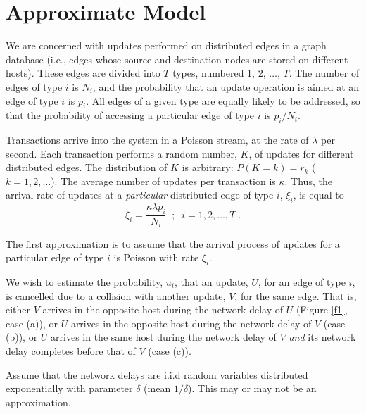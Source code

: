 \documentclass[runningheads]{llncs}
\begin{document}
\section{Approximate Model}

We are concerned with updates performed on distributed edges in a
graph database (i.e., edges whose source and destination nodes are
stored on different hosts). These edges are divided into $T$ types,
numbered 1, 2, $\ldots$, $T$. The number of edges of type $i$ is $N_i$,
and the probability that an update operation is aimed at an edge of
type $i$ is $p_i$. All edges of a given type are equally likely to be
addressed, so that the probability of accessing a particular edge of
type $i$ is $p_i/N_i$.

Transactions arrive into the system in a Poisson stream, at the rate
of $\lambda$ per second. Each transaction performs a random number, $K$,
of updates for different distributed edges. The distribution of $K$ is
arbitrary: $P(K=k)=r_k$ ($k=1,2,\ldots$). The average number of updates
per transaction is $\kappa$. Thus, the arrival rate of updates at a
{\em particular} distributed edge of type $i$, $\xi_i$, is equal to
\begin{equation} \label{xi}
\xi_i = \frac{\kappa\lambda p_i}{N_i}\;\;;\;\;i=1,2,\ldots,T\;.
\end{equation}

The first approximation is to assume that the arrival process of updates
for a particular edge of type $i$ is Poisson with rate $\xi_i$.

We wish to estimate the probability, $u_i$, that an update, $U$, for an edge
of type $i$, is cancelled due to a collision with another update, $V$, for
the same edge. That is, either $V$ arrives in the opposite host during the
network delay of $U$ (Figure \ref{f1}, case (a)), or $U$ arrives in the
opposite host during the network delay of $V$ (case (b)), or $U$ arrives in
the same host during the network delay of $V$ {\em and} its network delay
completes before that of $V$ (case (c)).

Assume that the network delays are i.i.d random variables distributed
exponentially with parameter $\delta$ (mean $1/\delta$). This may or may not
be an approximation.
\end{document}
